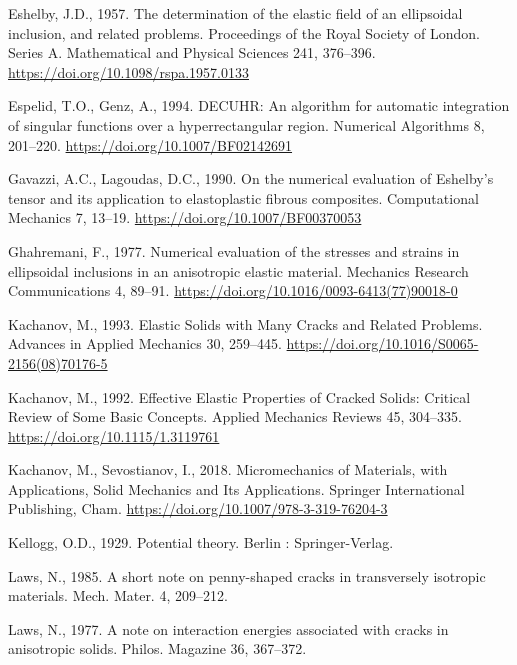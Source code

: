 \documentclass[
  letterpaper,
  DIV=11,
  numbers=noendperiod]{scrreprt}
\newlength{\cslhangindent}
\newenvironment{CSLReferences}[2] %
 {\begin{list}{}{%
  \setlength{\itemindent}{0pt}
  \setlength{\leftmargin}{0pt}
  \setlength{\parsep}{0pt}
  \ifodd #1
   \setlength{\leftmargin}{\cslhangindent}
   \setlength{\itemindent}{-1\cslhangindent}
  \fi
  \setlength{\itemsep}{#2\baselineskip}}}
 {\end{list}}
\begin{document}
\begin{CSLReferences}{1}{0}
Eshelby, J.D., 1957. The determination of the elastic field of an
ellipsoidal inclusion, and related problems. Proceedings of the Royal
Society of London. Series A. Mathematical and Physical Sciences 241,
376--396. \url{https://doi.org/10.1098/rspa.1957.0133}

Espelid, T.O., Genz, A., 1994. {DECUHR}: An algorithm for automatic
integration of singular functions over a hyperrectangular region.
Numerical Algorithms 8, 201--220.
\url{https://doi.org/10.1007/BF02142691}

Gavazzi, A.C., Lagoudas, D.C., 1990. On the numerical evaluation of
{Eshelby}'s tensor and its application to elastoplastic fibrous
composites. Computational Mechanics 7, 13--19.
\url{https://doi.org/10.1007/BF00370053}

Ghahremani, F., 1977. Numerical evaluation of the stresses and strains
in ellipsoidal inclusions in an anisotropic elastic material. Mechanics
Research Communications 4, 89--91.
\url{https://doi.org/10.1016/0093-6413(77)90018-0}

Kachanov, M., 1993. Elastic {Solids} with {Many Cracks} and {Related
Problems}. Advances in Applied Mechanics 30, 259--445.
\url{https://doi.org/10.1016/S0065-2156(08)70176-5}

Kachanov, M., 1992. Effective {Elastic Properties} of {Cracked Solids}:
{Critical Review} of {Some Basic Concepts}. Applied Mechanics Reviews
45, 304--335. \url{https://doi.org/10.1115/1.3119761}

Kachanov, M., Sevostianov, I., 2018. Micromechanics of {Materials}, with
{Applications}, Solid {Mechanics} and {Its Applications}. Springer
International Publishing, Cham.
\url{https://doi.org/10.1007/978-3-319-76204-3}

Kellogg, O.D., 1929. Potential theory. Berlin : Springer-Verlag.

Laws, N., 1985. A short note on penny-shaped cracks in transversely
isotropic materials. Mech. Mater. 4, 209--212.

Laws, N., 1977. A note on interaction energies associated with cracks in
anisotropic solids. Philos. Magazine 36, 367--372.


\end{CSLReferences}
\end{document}
